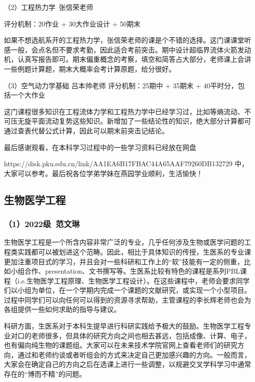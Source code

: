 （2）工程热力学\ 张信荣老师

评分机制：20作业 + 30大作业设计 + 50期末

如果不想选航系开的工程热力学，张信荣老师的课是个不错的选择。这门课课堂听感一般，会点名但不要求考勤，因此适合考前突击。期中设计超临界流体火箭发动机，认真写报告即可。期末偏重概念的考察，填空和简答占大部分，老师课上会讲一些例题计算题，期末大概率会考计算原题，给分很好。

\vspace{10pt}

（3）空气动力学基础 吕本帅老师
评分机制：25期中 + 35期末 + 40平时分，包括一个大作业

\vspace{10pt}

这门课程很多知识在工程流体力学和工程热力学中已经学习过，比如等熵流动、不可压无旋平面流动复势这些知识。新增加了一些结论性的知识，绝大部分计算都可通过查表代替公式计算，因此可以期末前突击记结论。

\vspace{10pt}

最后感谢观看，在本科学习过程中的一些学习资料已经放在网盘

https://disk.pku.edu.cn/link/AA1EA6B17FBAC44A65AAF79260DB132729
中，大家可以参考。最后祝各位学弟学妹在燕园学业顺利，生活愉快！

\subsection{生物医学工程}
\subsubsection{（1）2022级\ 范文琳}

生物医学工程是一个所含内容非常广泛的专业，几乎任何涉及生物或医学问题的工程类实践都可以被划进这个范畴。因此，相比于具体知识的传授，生医系的专业课更加注重项目式的学习，并且会对一些科研和工作上的“软”技能有一定的侧重，比如小组合作、presentation、文书撰写等。生医系比较有特色的课程是系列PBL课程（i.e.生物医学工程原理、生物医学工程设计）。在这些课程中，老师会要求同学们以小组为单位，在一个学期内完成一个课题的文献研究，或实现一个小型项目。过程中同学们可以向任何可以得到的资源寻求帮助，主管课程的李长辉老师也会为各组提供一些如何求助的指导与建议。

\vspace{10pt}

科研方面，生医系对于本科生提早进行科研实践给予极大的鼓励。生物医学工程专业对口的老师很多，但具体的研究方向之间也相去甚远，包括成像、计算、电子，也有偏向纯生物的课题组。大家可以在未来技术学院官网上查看老师们的研究方向，通过和老师约谈或者听组会的方式来决定自己更加感兴趣的方向。一般而言，大家会在确定自己的方向之后在选课上进行一些调整，以规避交叉学科学习中通常存在的“博而不精”的问题。

